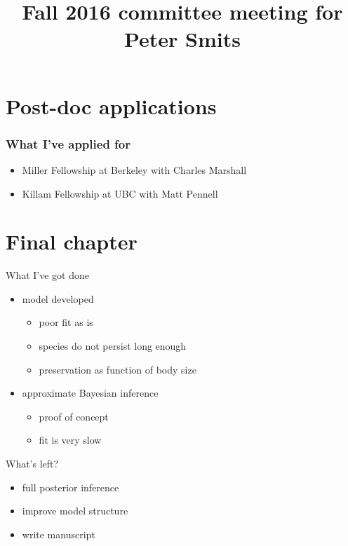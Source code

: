 \documentclass{beamer}
\title{Fall 2016 committee meeting for Peter Smits}
\author{}
\institute{}
\date{}
\begin{document}
\begin{frame}
  \maketitle
\end{frame}

\begin{frame}
  \tableofcontents
\end{frame}

\section{Post-doc applications}
\begin{frame}
  \frametitle{What I've applied for}
  \begin{itemize}
    \item Miller Fellowship at Berkeley with Charles Marshall
    \item Killam Fellowship at UBC with Matt Pennell
  \end{itemize}
\end{frame}


\section{Final chapter}
\begin{frame}
  \begin{block}{What I've got done}
    \begin{itemize}
      \item model developed
        \begin{itemize}
          \item poor fit as is
          \item species do not persist long enough
          \item preservation as function of body size
        \end{itemize}
      \item approximate Bayesian inference
        \begin{itemize}
          \item proof of concept
          \item fit is very slow
        \end{itemize}
    \end{itemize}
  \end{block}
\end{frame}

\begin{frame}
  \begin{block}{What's left?}
    \begin{itemize}
      \item full posterior inference
      \item improve model structure
      \item write manuscript
    \end{itemize}
  \end{block}
\end{frame}
\end{document}
